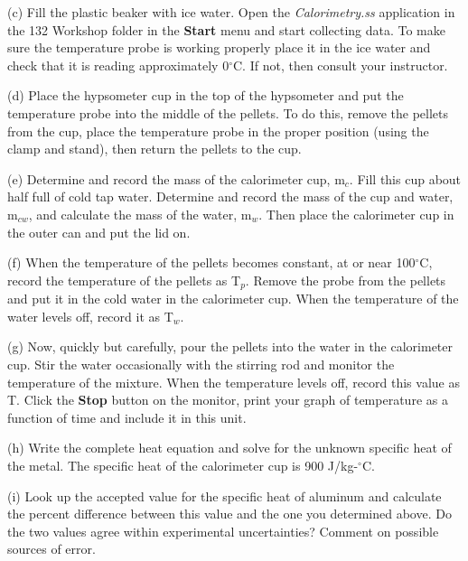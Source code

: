 (c) Fill the plastic beaker with ice water. Open the \textit{Calorimetry.ss}
application in the 132 Workshop folder in the {\bf Start} menu and start
collecting data. To make sure the temperature probe is working 
properly place it in the ice water and
check that it is reading approximately 0\( ^{\circ } \)C. If not,
then consult your instructor.

(d) Place the hypsometer cup in the top of the hypsometer and put the temperature probe into the middle of the pellets.  To do this, remove the pellets from the cup, place the temperature probe in the proper position (using the clamp and stand), then return the pellets to the cup.

(e) Determine and record the mass of the calorimeter cup, m\( _{c} \).
Fill this cup about half full of cold tap water. Determine and record
the mass of the cup and water, m\( _{cw} \), and calculate the mass
of the water, m\( _{w} \). Then place the calorimeter cup in the outer
can and put the lid on.
\vspace{15mm}

(f) When the temperature of the pellets becomes constant, at or near
100\( ^{\circ } \)C, record the temperature of the pellets as T\( _{p} \).
Remove the probe from the pellets and put it in the cold water in the calorimeter cup. When the temperature of the water levels off, record it as T\( _{w} \).
\vspace{15mm}

(g) Now, quickly but carefully, pour the pellets into the water in
the calorimeter cup. Stir the water occasionally with the stirring rod and
monitor the temperature of the mixture. When the temperature levels off, record
this value as T. Click the {\bf Stop} button on the monitor, print your graph 
of temperature as a function of time and include it in this unit.
\vspace{15mm}

(h) Write the complete heat equation and solve for the unknown specific
heat of the metal. 
The specific heat of the calorimeter cup is 900 J/kg-\( ^{\circ } \)C.
\vspace{2in}

(i) Look up the accepted value for the specific heat of aluminum and
calculate the percent difference between this value and the one you
determined above. Do the two values agree within experimental uncertainties?
Comment on possible sources of error.
\vspace{25mm}


